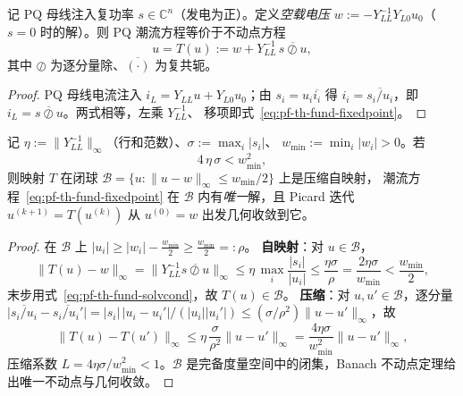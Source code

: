 \begin{proposition}[PQ 潮流的不动点形式]\label{prop:pf-th-fund-fixedpoint}
记 PQ 母线注入复功率 $s\in\mathbb C^n$（发电为正）。定义\emph{空载电压}
$w:=-Y_{LL}^{-1}Y_{L0}u_0$（$s=0$ 时的解）。则 PQ 潮流方程等价于不动点方程
\begin{equation}
u=T(u):=w+Y_{LL}^{-1}\,\overline{s\oslash u},
\label{eq:pf-th-fund-fixedpoint}
\end{equation}
其中 $\oslash$ 为逐分量除、$\overline{(\cdot)}$ 为复共轭。
\end{proposition}
\begin{proof}
PQ 母线电流注入 $i_L=Y_{LL}u+Y_{L0}u_0$；由 $s_i=u_i\overline{i_i}$ 得
$i_i=\overline{s_i/u_i}$，即 $i_L=\overline{s\oslash u}$。两式相等，左乘 $Y_{LL}^{-1}$、
移项即式~\eqref{eq:pf-th-fund-fixedpoint}。
\end{proof}

\begin{theorem}[压缩可解性条件]\label{thm:pf-th-fund-solvability}
记 $\eta:=\lVert Y_{LL}^{-1}\rVert_\infty$（行和范数）、$\sigma:=\max_i|s_i|$、
$w_{\min}:=\min_i|w_i|>0$。若
\begin{equation}
4\,\eta\,\sigma<w_{\min}^2,
\label{eq:pf-th-fund-solvcond}
\end{equation}
则映射 $T$ 在闭球 $\mathcal B=\{u:\lVert u-w\rVert_\infty\le w_{\min}/2\}$ 上是压缩自映射，
潮流方程~\eqref{eq:pf-th-fund-fixedpoint} 在 $\mathcal B$ 内有\emph{唯一}解，且 Picard
迭代 $u^{(k+1)}=T(u^{(k)})$ 从 $u^{(0)}=w$ 出发几何收敛到它。
\end{theorem}
\begin{proof}
在 $\mathcal B$ 上 $|u_i|\ge|w_i|-\tfrac{w_{\min}}2\ge\tfrac{w_{\min}}2=:\rho$。
\textbf{自映射}：对 $u\in\mathcal B$，
\begin{equation*}
\lVert T(u)-w\rVert_\infty=\bigl\lVert Y_{LL}^{-1}\overline{s\oslash u}\bigr\rVert_\infty
\le\eta\,\max_i\frac{|s_i|}{|u_i|}\le\frac{\eta\sigma}{\rho}
=\frac{2\eta\sigma}{w_{\min}}<\frac{w_{\min}}2,
\end{equation*}
末步用式~\eqref{eq:pf-th-fund-solvcond}，故 $T(u)\in\mathcal B$。
\textbf{压缩}：对 $u,u'\in\mathcal B$，逐分量
$\bigl|\overline{s_i/u_i}-\overline{s_i/u_i'}\bigr|
=|s_i|\,|u_i-u_i'|/(|u_i||u_i'|)\le(\sigma/\rho^2)\lVert u-u'\rVert_\infty$，故
\begin{equation*}
\lVert T(u)-T(u')\rVert_\infty\le\eta\,\frac{\sigma}{\rho^2}\lVert u-u'\rVert_\infty
=\frac{4\eta\sigma}{w_{\min}^2}\lVert u-u'\rVert_\infty,
\end{equation*}
压缩系数 $L=4\eta\sigma/w_{\min}^2<1$。$\mathcal B$ 是完备度量空间中的闭集，Banach
不动点定理给出唯一不动点与几何收敛。
\end{proof}

